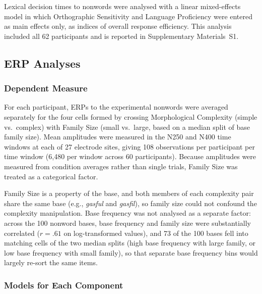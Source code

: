 \documentclass[utf8]{FrontiersinHarvard} %
\begin{document}
Lexical decision times to nonwords were analysed with a linear mixed-effects model in which Orthographic Sensitivity and Language Proficiency were entered as main effects only, as indices of overall response efficiency. This analysis included all 62 participants and is reported in Supplementary Materials~S1.

\subsection{ERP Analyses}

\subsubsection{Dependent Measure}

For each participant, ERPs to the experimental nonwords were averaged separately for the four cells formed by crossing Morphological Complexity (simple vs.\ complex) with Family Size (small vs.\ large, based on a median split of base family size). %
Mean amplitudes were measured in the N250 and N400 time windows at each of 27 electrode sites, giving 108 observations per participant per time window (6,480 per window across 60 participants). %
Because amplitudes were measured from condition averages rather than single trials, Family Size was treated as a categorical factor.

Family Size is a property of the base, and both members of each complexity pair share the same base (e.g., \textit{gasful} and \textit{gasfil}), so family size could not confound the complexity manipulation. Base frequency was not analysed as a separate factor: across the 100 nonword bases, base frequency and family size were substantially correlated ($r = .61$ on log-transformed values), and 73 of the 100 bases fell into matching cells of the two median splits (high base frequency with large family, or low base frequency with small family), so that separate base frequency bins would largely re-sort the same items.

\subsubsection{Models for Each Component}
\end{document}
